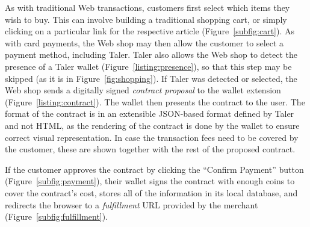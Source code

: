 \documentclass{IEEEtran}
\begin{document}
As with traditional Web transactions, customers first select which
items they wish to buy.  This can involve building a traditional
shopping cart, or simply clicking on a particular link for the
respective article (Figure~\ref{subfig:cart}).  As with card payments,
the Web shop may then allow the customer to select a payment method,
including Taler.  Taler also allows the Web shop to detect
the presence of a Taler wallet (Figure~\ref{listing:presence}), so
that this step may be skipped (as it is in Figure~\ref{fig:shopping}).
If Taler was detected or selected, the Web shop sends a digitally
signed {\em contract proposal} to the wallet extension
(Figure~\ref{listing:contract}).  The wallet then presents the
contract to the user.  The format of the contract is in an extensible
JSON-based format defined by Taler and not HTML, as the
rendering of the contract is done by the wallet to ensure correct
visual representation.  In case the transaction fees need to be
covered by the customer, these are shown together with the rest of the
proposed contract.

If the customer approves the contract by clicking the ``Confirm
Payment'' button (Figure~\ref{subfig:payment}), their wallet signs the
contract with enough coins to cover the contract's cost, stores all of
the information in its local database, and redirects the browser to a
{\em fulfillment} URL provided by the merchant
(Figure~\ref{subfig:fulfillment}).
\end{document}
